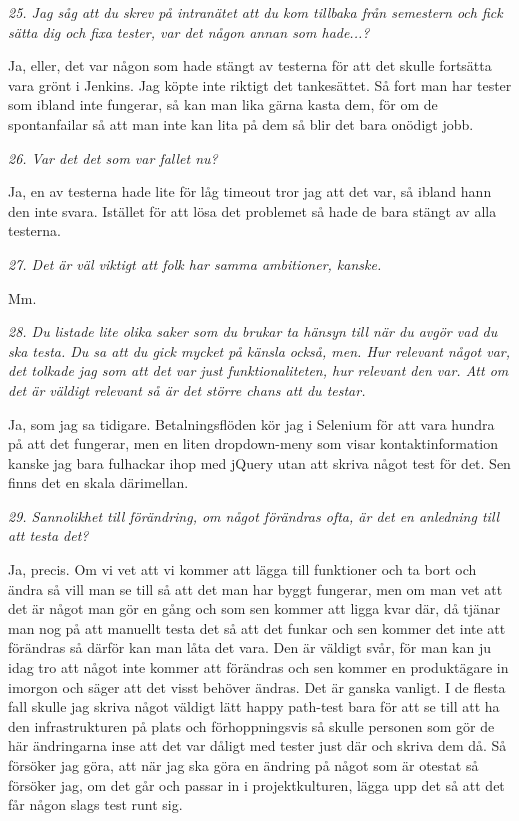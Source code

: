 \documentclass[11pt]{article}
\begin{document}
\emph{25. Jag såg att du skrev på intranätet att du kom tillbaka från semestern och fick sätta dig och fixa tester, var det någon annan som hade...?}

Ja, eller, det var någon som hade stängt av testerna för att det skulle fortsätta vara grönt i Jenkins. Jag köpte inte riktigt det tankesättet. Så fort man har tester som ibland inte fungerar, så kan man lika gärna kasta dem, för om de spontanfailar så att man inte kan lita på dem så blir det bara onödigt jobb.

\emph{26. Var det det som var fallet nu?}

Ja, en av testerna hade lite för låg timeout tror jag att det var, så ibland hann den inte svara. Istället för att lösa det problemet så hade de bara stängt av alla testerna.

\emph{27. Det är väl viktigt att folk har samma ambitioner, kanske.}

Mm.

\emph{28. Du listade lite olika saker som du brukar ta hänsyn till när du avgör vad du ska testa. Du sa att du gick mycket på känsla också, men. Hur relevant något var, det tolkade jag som att det var just funktionaliteten, hur relevant den var. Att om det är väldigt relevant så är det större chans att du testar.}

Ja, som jag sa tidigare. Betalningsflöden kör jag i Selenium för att vara hundra på att det fungerar, men en liten dropdown-meny som visar kontaktinformation kanske jag bara fulhackar ihop med jQuery utan att skriva något test för det. Sen finns det en skala därimellan.

\emph{29. Sannolikhet till förändring, om något förändras ofta, är det en anledning till att testa det?}

Ja, precis. Om vi vet att vi kommer att lägga till funktioner och ta bort och ändra så vill man se till så att det man har byggt fungerar, men om man vet att det är något man gör en gång och som sen kommer att ligga kvar där, då tjänar man nog på att manuellt testa det så att det funkar och sen kommer det inte att förändras så därför kan man låta det vara. Den är väldigt svår, för man kan ju idag tro att något inte kommer att förändras och sen kommer en produktägare in imorgon och säger att det visst behöver ändras. Det är ganska vanligt. I de flesta fall skulle jag skriva något väldigt lätt happy path-test bara för att se till att ha den infrastrukturen på plats och förhoppningsvis så skulle personen som gör de här ändringarna inse att det var dåligt med tester just där och skriva dem då. Så försöker jag göra, att när jag ska göra en ändring på något som är otestat så försöker jag, om det går och passar in i projektkulturen, lägga upp det så att det får någon slags test runt sig.
\end{document}

